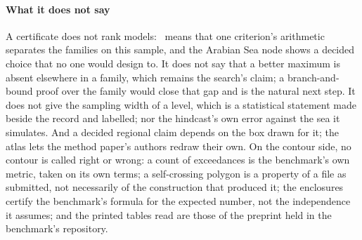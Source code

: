 \documentclass[preprint,11pt,authoryear]{elsarticle}
\begin{document}
\paragraph{What it does not say}
A certificate does not rank models: \vDecided\ means that one criterion's arithmetic separates the families on this sample, and the Arabian Sea node shows a decided choice that no one would design to. It does not say that a better maximum is absent elsewhere in a family, which remains the search's claim; a branch-and-bound proof over the family would close that gap and is the natural next step. It does not give the sampling width of a level, which is a statistical statement made beside the record and labelled; nor the hindcast's own error against the sea it simulates. And a decided regional claim depends on the box drawn for it; the atlas lets the method paper's authors redraw their own. On the contour side, no contour is called right or wrong: a count of exceedances is the benchmark's own metric, taken on its own terms; a self-crossing polygon is a property of a file as submitted, not necessarily of the construction that produced it; the enclosures certify the benchmark's formula for the expected number, not the independence it assumes; and the printed tables read are those of the preprint held in the benchmark's repository.
\end{document}
